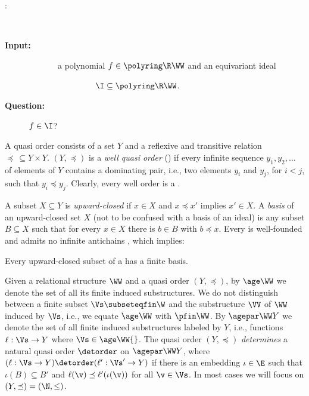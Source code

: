 \begin{description}                                                                                                                                                               
\item[:]           \    
\item[\bf Input: ] \ \ \ \ \ \ \ a polynomial $f\in\polyring \R \WW$ and an equivariant ideal 
\item[] \ \ \ \ \ \ \ \ \ \ \ \ \ \ \ \ $\I\subseteq \polyring \R \WW$.
\item[\bf Question: ] $f\in\I$?
\end{description}                                                                                                                                                                 



A quasi order consists of a set $Y$ and a reflexive and transitive
relation $\preceq\,\subseteq Y\times Y$.
$(Y, \preceq)$ is a \emph{well quasi order} (\wqo) 
if 
every infinite sequence $y_1, y_2, \ldots$ of elements of $Y$ contains a dominating pair,
i.e., two elements $y_i$ and $y_j$, for $i<j$, such that $y_i \preceq y_j$.
Clearly, every well order is a \wqo.

A subset $X\subseteq Y$ is \emph{upward-closed} if $x\in X$ and $x\preceq x'$ implies $x'\in X$.
A \emph{basis} of an upward-closed set $X$ 
(not to be confused with a basis of an ideal) is any subset $B\subseteq X$ such that
for every $x\in X$ there is $b\in B$ with $b\preceq x$.
Every \wqo is well-founded and admits no infinite antichains
\cite[Proposition 12.1.1]{diestel}, which implies:

\begin{lemma} \label{lem:wqo}%
Every upward-closed subset of a \wqo has a finite basis.
\end{lemma}

Given a relational structure $\WW$ and a quasi order $(Y, \preceq)$, 
by $\age \WW$ we denote the set of all its finite induced substructures.
We do not distinguish between a finite subset $\Vs\subseteqfin \W$ and the substructure 
$\VV$ of $\WW$ induced by $\Vs$, i.e., we equate $\age \WW$ with $\pfin \WW$.
By $\agepar \WW Y$ we denote the set of all finite induced substructures labeled by $Y$,
i.e., functions $\ell : \Vs \to Y$ where $\Vs  \in \age \WW {}$.
The quasi order $(Y, \preceq)$ \emph{determines} a natural quasi order $\detorder$ on
$\agepar \WW Y$, where $(\ell : \Vs \to Y) \detorder (\ell' : \Vs' \to Y)$ if there is an embedding 
$\iota\in\E$
such that $\iota(B)\subseteq B'$ and
$\ell(\v) \preceq \ell'(\iota(\v))$ for all $\v \in \Vs$.
In most cases we will focus on $(Y, \preceq) = (\N, \leq)$.

